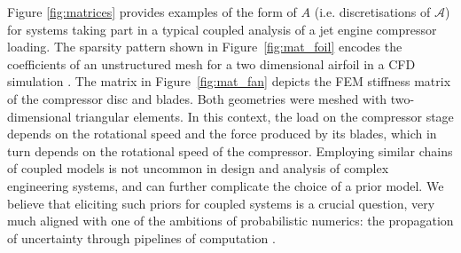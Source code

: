 \documentclass[twoside]{article}
\begin{document}
		Figure \ref{fig:matrices} provides examples of the form of $A$ (i.e. discretisations of $\mathcal{A}$) for systems taking part in a typical coupled analysis of a jet engine compressor loading. The sparsity pattern shown in Figure~\ref{fig:mat_foil} encodes the coefficients of an unstructured mesh for a two dimensional airfoil in a CFD simulation \cite{Davis:2011}. The matrix in Figure~\ref{fig:mat_fan} depicts the FEM stiffness matrix of the compressor disc and blades. Both geometries were meshed with two-dimensional triangular elements. %
		In this context, the load on the compressor stage depends on the rotational speed and the force produced by its blades, which in turn depends on the rotational speed of the compressor. 
		Employing similar chains of coupled models is not uncommon in design and analysis of complex engineering systems, and can further complicate the choice of a prior model. We believe that eliciting such priors for coupled systems is a crucial question, very much aligned with one of the ambitions of probabilistic numerics: the propagation of uncertainty through pipelines of computation \cite{PN15}.
\end{document}
